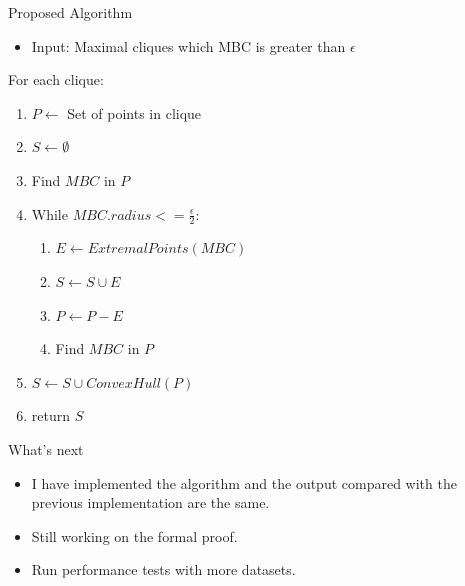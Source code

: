 \documentclass{beamer}
\begin{document}
\begin{frame}{Proposed Algorithm}
    \begin{itemize}
        \item Input: Maximal cliques which MBC is greater than $\epsilon$
    \end{itemize}
    For each clique:
    \begin{enumerate}[label*=\arabic*.]
        \item $P \leftarrow $ Set of points in clique
        \item $S \leftarrow \emptyset$
        \item Find $MBC$ in $P$
        \item While $MBC.radius <= \frac{\epsilon}{2}$:
        \begin{enumerate}[label*=\arabic*.]
            \item $E \leftarrow ExtremalPoints(MBC)$ 
            \item $S \leftarrow S \cup E$
            \item $P \leftarrow P - E$
            \item Find $MBC$ in $P$
        \end{enumerate}
        \item $S \leftarrow S \cup ConvexHull(P)$
        \item return $S$
    \end{enumerate}
\end{frame}

\begin{frame}{What's next}
    \begin{itemize}
        \item I have implemented the algorithm and the output compared with the previous implementation are the same.
        \item Still working on the formal proof.
        \item Run performance tests with more datasets.
    \end{itemize}

\end{frame}
\end{document}
